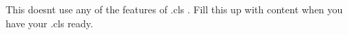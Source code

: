 \documentclass{resume_ssl}
\begin{document}
This doesnt use any of the features of .cls . Fill this up with content when you have your .cls ready.
\end{document}

